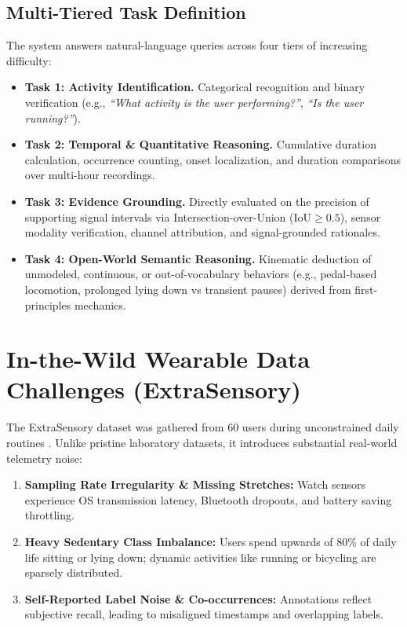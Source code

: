 \documentclass[11pt,a4paper]{article}
\begin{document}
\subsection{Multi-Tiered Task Definition}
The system answers natural-language queries across four tiers of increasing difficulty:
\begin{itemize}
    \item \textbf{Task 1: Activity Identification.} Categorical recognition and binary verification (e.g., \textit{``What activity is the user performing?''}, \textit{``Is the user running?''}).
    \item \textbf{Task 2: Temporal \& Quantitative Reasoning.} Cumulative duration calculation, occurrence counting, onset localization, and duration comparisons over multi-hour recordings.
    \item \textbf{Task 3: Evidence Grounding.} Directly evaluated on the precision of supporting signal intervals via Intersection-over-Union ($\text{IoU} \ge 0.5$), sensor modality verification, channel attribution, and signal-grounded rationales.
    \item \textbf{Task 4: Open-World Semantic Reasoning.} Kinematic deduction of unmodeled, continuous, or out-of-vocabulary behaviors (e.g., pedal-based locomotion, prolonged lying down vs transient pauses) derived from first-principles mechanics.
\end{itemize}

\section{In-the-Wild Wearable Data Challenges (ExtraSensory)}
The ExtraSensory dataset was gathered from 60 users during unconstrained daily routines \cite{vaizman2017recognizing}. Unlike pristine laboratory datasets, it introduces substantial real-world telemetry noise:
\begin{enumerate}
    \item \textbf{Sampling Rate Irregularity \& Missing Stretches:} Watch sensors experience OS transmission latency, Bluetooth dropouts, and battery saving throttling.
    \item \textbf{Heavy Sedentary Class Imbalance:} Users spend upwards of 80\% of daily life sitting or lying down; dynamic activities like running or bicycling are sparsely distributed.
    \item \textbf{Self-Reported Label Noise \& Co-occurrences:} Annotations reflect subjective recall, leading to misaligned timestamps and overlapping labels.
\end{enumerate}
\end{document}
